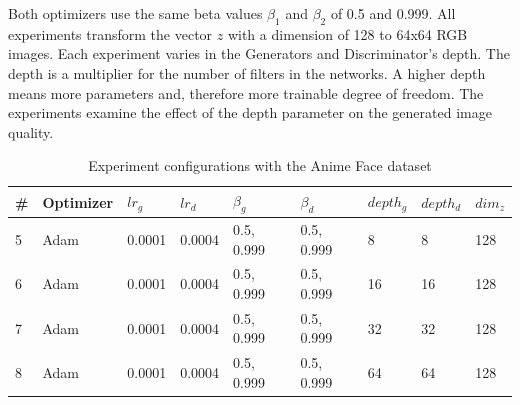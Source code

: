 Both optimizers use the same beta values $ \beta_{1} $ and $ \beta_{2} $ of 0.5 and 0.999. All experiments transform the vector $ z $ with a dimension of 128 to 64x64 RGB images. Each experiment varies in the Generators and Discriminator's depth. The depth is a multiplier for the number of filters in the networks. A higher depth means more parameters and, therefore more trainable degree of freedom. The experiments examine the effect of the depth parameter on the generated image quality. \\

\begin{table}[H]
    \centering
    \begin{tabular}{@{}lllllllll@{}}
    \toprule
    \# & Optimizer & $ lr_{g} $ & $ lr_{d} $ & $ \beta_{g} $ & $ \beta_{d} $ & $ depth_{g} $ & $ depth_{d} $ & $ dim_{z} $ \\ \midrule
    5 & Adam & 0.0001 & 0.0004 & 0.5, 0.999 & 0.5, 0.999 & 8  & 8  & 128 \\
    6 & Adam & 0.0001 & 0.0004 & 0.5, 0.999 & 0.5, 0.999 & 16 & 16 & 128 \\
    7 & Adam & 0.0001 & 0.0004 & 0.5, 0.999 & 0.5, 0.999 & 32 & 32 & 128 \\
    8 & Adam & 0.0001 & 0.0004 & 0.5, 0.999 & 0.5, 0.999 & 64 & 64 & 128 \\ \bottomrule
    \end{tabular}
    \caption{Experiment configurations with the Anime Face dataset}
\label{tab:experiments_anime_face}
\end{table}

\newpage